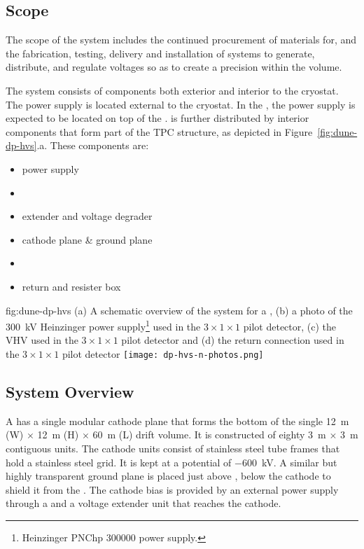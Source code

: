 \subsection{Scope}
\label{sec:fddp-hv-scope}
The scope of the \hv system 
includes the continued procurement of materials for, and the fabrication, testing, delivery and installation of systems to generate, distribute, and regulate voltages so as to create a precision \efield within the \detmodule volume. 

The \hv system consists of components both exterior and interior to the cryostat. The \hv power supply is located external to the cryostat.  In the , the \hv power supply is expected to be located on top of the \hv \fdth.  is further distributed by interior components that form part of the TPC structure, as depicted in Figure~\ref{fig:dune-dp-hvs}.a.  These components are:

\begin{itemize}
\item power supply
\item {} \fdth
\item \hv extender and voltage degrader
\item cathode plane \& ground plane
\item \fcage
\item \hv return \fdth and resister box
\end{itemize}


\begin{dunefigure}
{fig:dune-dp-hvs}
{(a) A schematic overview of the \hv system for a \dpmod{}, 
(b) a photo of the \SI{300}{\kV} Heinzinger power supply\footnote{Heinzinger\texttrademark{} PNChp 300000 power supply.} used in the $3\times 1\times 1$ pilot \dual detector, (c) the VHV \fdth used in the $3\times 1\times 1$ pilot \dual detector and (d) the \hv return connection used in the $3\times 1 \times 1$ pilot \dual detector}
\texttt{[image: dp-hvs-n-photos.png]}
\end{dunefigure}

\subsection{System Overview}

A \dpmod  has a single modular cathode plane that forms the bottom of the single  \SI{12}{\m} (W) $\times$ \SI{12}{\m} (H) $\times$ \SI{60}{\m} (L) drift volume. It is constructed of eighty \SI{3}{\m} $\times$ \SI{3}{\m} contiguous units. 
The cathode units consist of stainless steel tube frames that hold a stainless steel grid. It is kept at a potential of \SI{-600}{\kV}.  A similar but highly transparent ground plane is placed just above , below the cathode to shield it from the .
The cathode bias is provided by an external \hv power supply through a \hv \fdth and a voltage extender unit that reaches the cathode.
 
